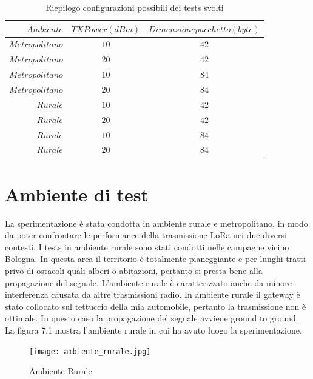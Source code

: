 \documentclass[12pt,a4paper,openright,twoside]{report}
\begin{document}
\begin{table}[h]                        
\begin{center}                          
\begin{tabular}{r|c|c}                  
                                                   
$Ambiente$ & $TX Power (dBm)$ & $Dimensione pacchetto (byte)$\\         
\hline\hline                                  
$Metropolitano$ & $10$ & $42$\\     
\hline                               
$Metropolitano$ & $20$ & $42$\\
\hline        
$Metropolitano$ & $10$ & $84$\\ 
\hline 
$Metropolitano$ & $20$ & $84$\\ 
\hline 
$Rurale$ & $10$ & $42$\\     
\hline                               
$Rurale$ & $20$ & $42$\\
\hline        
$Rurale$ & $10$ & $84$\\ 
\hline 
$Rurale$ & $20$ & $84$\\ 
\hline \hline                         
\end{tabular}
\caption[Riepilogo configurazioni possibili dei tests svolti]{Riepilogo configurazioni possibili dei tests svolti}\label{tab:uno}
\end{center}
\end{table}


\section{Ambiente di test}
La sperimentazione \`e stata condotta in ambiente rurale e metropolitano, in modo da poter confrontare le performance della trasmissione LoRa nei due diversi contesti. 
I tests in ambiente rurale sono stati condotti nelle campagne vicino Bologna. In questa area il territorio \`e totalmente pianeggiante e per lunghi tratti privo di ostacoli quali alberi o abitazioni, pertanto si presta bene alla propagazione del segnale. L'ambiente rurale \`e caratterizzato anche da minore interferenza causata da altre trasmissioni radio. In ambiente rurale il gateway \`e stato collocato sul tettuccio della mia automobile, pertanto la trasmissione non \`e ottimale. In questo caso la propagazione del segnale avviene ground to ground. 
La figura 7.1 mostra l'ambiente rurale in cui ha avuto luogo la sperimentazione.
\begin{figure}[h]                      
\begin{center} 
\texttt{[image: ambiente\_rurale.jpg]}
\caption[Ambiente Rurale]{Ambiente Rurale}\label{fig:prima}
\end{center}
\end{figure}
\end{document}

